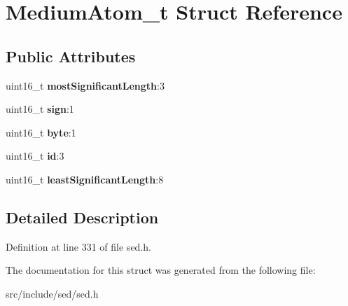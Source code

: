 \hypertarget{structMediumAtom__t}{}\section{Medium\+Atom\+\_\+t Struct Reference}
\label{structMediumAtom__t}
\subsection*{Public Attributes}
\begin{DoxyCompactItemize}
\item 
\hypertarget{structMediumAtom__t_a4cc7d72e3217e614e7dc4139b240d92d}{}uint16\+\_\+t {\bfseries most\+Significant\+Length}\+:3\label{structMediumAtom__t_a4cc7d72e3217e614e7dc4139b240d92d}

\item 
\hypertarget{structMediumAtom__t_acb651f17fb4c413d8e97d043fc85ba03}{}uint16\+\_\+t {\bfseries sign}\+:1\label{structMediumAtom__t_acb651f17fb4c413d8e97d043fc85ba03}

\item 
\hypertarget{structMediumAtom__t_a91de99bb07a66cd56e3d3b19ade700d5}{}uint16\+\_\+t {\bfseries byte}\+:1\label{structMediumAtom__t_a91de99bb07a66cd56e3d3b19ade700d5}

\item 
\hypertarget{structMediumAtom__t_aa73897ad180334f12c7e3094ad482cb8}{}uint16\+\_\+t {\bfseries id}\+:3\label{structMediumAtom__t_aa73897ad180334f12c7e3094ad482cb8}

\item 
\hypertarget{structMediumAtom__t_ac6551126f4afab399de4301a328a10be}{}uint16\+\_\+t {\bfseries least\+Significant\+Length}\+:8\label{structMediumAtom__t_ac6551126f4afab399de4301a328a10be}

\end{DoxyCompactItemize}


\subsection{Detailed Description}


Definition at line 331 of file sed.\+h.



The documentation for this struct was generated from the following file\+:\begin{DoxyCompactItemize}
\item 
src/include/sed/sed.\+h\end{DoxyCompactItemize}
